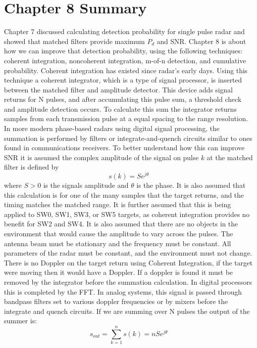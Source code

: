 \documentclass[12pt]{article}
\begin{document}
\section{Chapter 8 Summary}
Chapter 7 discussed calculating detection probability for single pulse radar and showed that matched filters provide maximum $P_d$ and SNR. Chapter 8 is about how we can improve that detection probability, using the following techniques: coherent integration, noncoherent integration, m-of-n detection, and cumulative probability. Coherent integration has existed since radar's early days. Using this technique a coherent integrator, which is a type of signal processor, is inserted between the matched filter and amplitude detector. This device adds signal returns for N pulses, and after accumulating this pulse sum, a threshold check and amplitude detection occurs. To calculate this sum the integrator returns samples from each transmission pulse at a equal spacing to the range resolution. In more modern phase-based radars using digital signal processing, the summation is performed by filters or integrate-and-quench circuits similar to ones found in communications receivers. To better understand how this can improve SNR it is assumed the complex amplitude of the signal on pulse $k$ at the matched filter is defined by
\begin{equation}
    s(k) = S e^{j \theta}
\end{equation}
where $ S>0 $ is the signals amplitude and $\theta$ is the phase. It is also assumed that this calculation is for one of the many samples that the target returns, and the timing matches the matched range. It is further assumed that this is being applied to SW0, SW1, SW3, or SW5 targets, as coherent integration provides no benefit for SW2 and SW4. It is also assumed that there are no objects in the environment that would cause the amplitude to vary across the pulses. The antenna beam must be stationary and the frequency must be constant. All parameters of the radar must be constant, and the environment must not change. There is no Doppler on the target return using Coherent Integration, if the target were moving then it would have a Doppler. If a doppler is found it must be removed by the integrator before the summation calculation. In digital processors this is completed by the FFT. In analog systems, this signal is passed through bandpass filters set to various doppler frequencies or by mixers before the integrate and quench circuits. If we are summing over N pulses the output of the summer is:
\begin{equation}
    s_{out} = \sum_{k=1}^{n} s(k) = nSe^{j \theta}
\end{equation}
\end{document}
